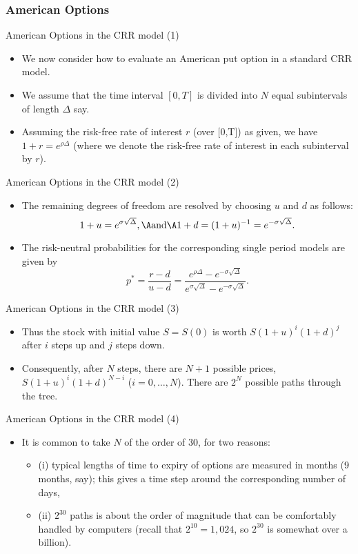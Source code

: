 \subsubsection{American Options}


{ American Options in the CRR model (1)}
\begin{itemize}
  \item We now consider how to evaluate an American put option in a
standard CRR model.
\item We assume that the time interval $[0,T]$ is
divided into $N$ equal subintervals of length $\Delta $ say.
\item Assuming the risk-free rate of interest $r$ (over [0,T]) as given,
we have $1+r = e^{\rho \Delta}$ (where we denote the risk-free
rate of interest in each subinterval by $r$).
\end{itemize}



{ American Options in the CRR model (2)}
\begin{itemize}
  \item The remaining
degrees of freedom are resolved by choosing $u$ and $d$ as
follows:
$$
1+u= e^{\sigma \sqrt{\Delta}}, \A \mbox{and} \A 1+d = (1+u)^{-1} =
e^{-\sigma \sqrt{\Delta}}.
$$
\item
The risk-neutral probabilities for
the corresponding single period models are given by
$$
p^*= \frac{r-d}{u-d} = \frac{e^{\rho \Delta}-e^{-\sigma
\sqrt{\Delta}}} {e^{\sigma \sqrt{\Delta}}-e^{-\sigma
\sqrt{\Delta}}}.
$$
\end{itemize}



{ American Options in the CRR model (3)}
\begin{itemize}
  \item Thus the stock with initial value $S = S(0)$ is worth $S (1+u)^i
(1+d)^j$ after $i$ steps up and $j$ steps down.
\item Consequently,
after $N$ steps, there are $N+1$ possible prices, $S (1+u)^i
(1+d)^{N-i}$ ($i = 0, \ldots, N$). There are $2^N$ possible paths
through the tree.
\end{itemize}



{ American Options in the CRR model (4)}
\begin{itemize}
  \item It is common to take $N$ of the order of 30, for
two reasons:
\begin{itemize}
  \item (i) typical lengths of time to expiry of
options are measured in months (9 months, say); this
gives a time step around the corresponding number of days,
\item (ii) $2^{30}$ paths is about the order of magnitude that can be
comfortably handled by computers (recall that $2^{10} = 1,024$, so
$2^{30}$ is somewhat over a billion).
\end{itemize}
\end{itemize}



